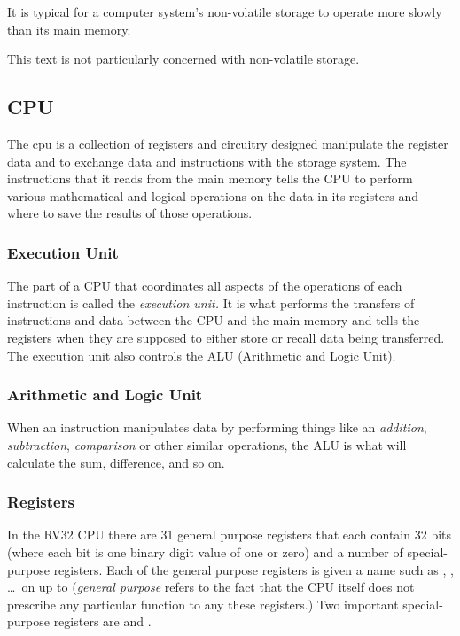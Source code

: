 It is typical for a computer system's non-volatile storage to operate
more slowly than its main memory.

This text is not particularly concerned with non-volatile storage. 

\subsection{CPU}

The \acrshort{cpu} is a collection of registers and circuitry designed
manipulate the register data and to exchange data and instructions with the 
storage system.  The instructions that it reads from the main memory tells 
the CPU to perform various mathematical and logical operations on the data 
in its registers and where to save the results of those operations.

\subsubsection{Execution Unit}

The part of a CPU that coordinates all aspects of the operations of each 
instruction is called the {\em execution unit.}  It is what performs the transfers 
of instructions and data between the CPU and the main memory and tells the 
registers when they are supposed to either store or recall data being transferred.  
The execution unit also controls the ALU (Arithmetic and Logic Unit).

\subsubsection{Arithmetic and Logic Unit}

When an instruction manipulates data by performing things like an {\em addition},
{\em subtraction}, {\em comparison} or other similar operations, the ALU is what
will calculate the sum, difference, and so on.

\subsubsection{Registers}

In the RV32 CPU there are 31 general purpose registers that each contain 32 \gls{bit}s 
(where each bit is one \gls{binary} digit value of one or zero) and a number 
of special-purpose registers.
Each of the general purpose registers is given a name such as , ,
\ldots\ on up to  ({\em general purpose} refers to the fact that the CPU 
itself does not prescribe any particular function to any these registers.)
Two important special-purpose registers are  and .

